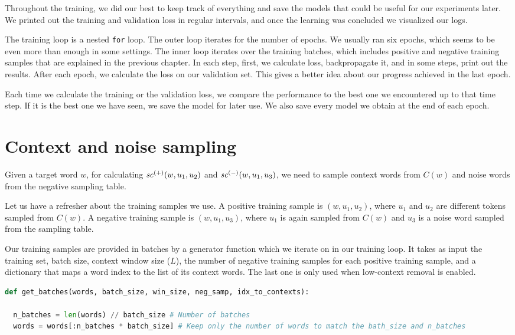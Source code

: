 Throughout the training, we did our best to keep track of everything and save the models that could be useful for our experiments later. We printed out the training and validation loss in regular intervals, and once the learning was concluded we visualized our logs.

The training loop is a nested \verb|for| loop. The outer loop iterates for the number of epochs. We usually ran six epochs, which seems to be even more than enough in some settings. The inner loop iterates over the training batches, which includes positive and negative training samples that are explained in the previous chapter. In each step, first, we calculate loss, backpropagate it, and in some steps, print out the results. After each epoch, we calculate the loss on our validation set. This gives a better idea about our progress achieved in the last epoch. 

Each time we calculate the training or the validation loss, we compare the performance to the best one we encountered up to that time step. If it is the best one we have seen, we save the model for later use. We also save every model we obtain at the end of each epoch.

\section{Context and noise sampling}

Given a target word $w$, for calculating $\mathit{sc}^{({+})}({w, u_1, u_2})$ and $\mathit{sc}^{({-})}({w, u_1, u_3})$, we need to sample context words from $C(w)$ and noise words from the negative sampling table. 

Let us have a refresher about the training samples we use. A positive training sample is $(w, u_1, u_2)$, where $u_1$ and $u_2$ are different tokens sampled from $C(w)$. A negative training sample is $(w, u_1, u_3)$, where $u_1$ is again sampled from $C(w)$ and $u_3$ is a noise word sampled from the sampling table.

Our training samples are provided in batches by a generator function which we iterate on in our training loop. It takes as input the training set, batch size, context window size ($L$), the number of negative training samples for each positive training sample, and a dictionary that maps a word index to the list of its context words. The last one is only used when low-context removal is enabled.

\begin{lstlisting}[language=Python, caption=Batch generating function - Part 1]
def get_batches(words, batch_size, win_size, neg_samp, idx_to_contexts):

  n_batches = len(words) // batch_size # Number of batches
  words = words[:n_batches * batch_size] # Keep only the number of words to match the bath_size and n_batches

\end{lstlisting}

